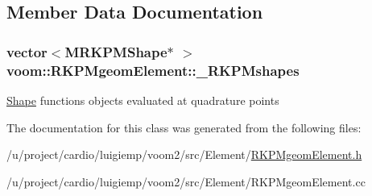 \subsection{Member Data Documentation}
\hypertarget{classvoom_1_1_r_k_p_mgeom_element_a523f9b8a58ef870105d7afc70243d40d}{
\subsubsection[{\_\-RKPMshapes}]{\setlength{\rightskip}{0pt plus 5cm}vector$<${\bf MRKPMShape}$\ast$ $>$ {\bf voom::RKPMgeomElement::\_\-RKPMshapes}}}
\label{classvoom_1_1_r_k_p_mgeom_element_a523f9b8a58ef870105d7afc70243d40d}
\hyperlink{classvoom_1_1_shape}{Shape} functions objects evaluated at quadrature points 

The documentation for this class was generated from the following files:\begin{DoxyCompactItemize}
\item 
/u/project/cardio/luigiemp/voom2/src/Element/\hyperlink{_r_k_p_mgeom_element_8h}{RKPMgeomElement.h}\item 
/u/project/cardio/luigiemp/voom2/src/Element/RKPMgeomElement.cc\end{DoxyCompactItemize}
